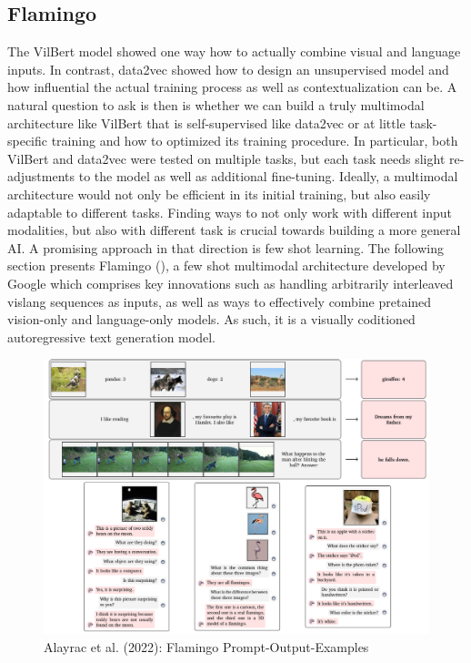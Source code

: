 \documentclass[
]{krantz}
\begin{document}
\hypertarget{flamingo}{%
\subsection{Flamingo}\label{flamingo}}

The VilBert model showed one way how to actually combine visual and language inputs. In contrast, data2vec showed how to design an unsupervised model and how influential the actual training process as well as contextualization can be.
A natural question to ask is then is whether we can build a truly multimodal architecture like VilBert that is self-supervised like data2vec or at little task-specific training and how to optimized its training procedure. In particular, both VilBert and data2vec were tested on multiple tasks, but each task needs slight re-adjustments to the model as well as additional fine-tuning. Ideally, a multimodal architecture would not only be efficient in its initial training, but also easily adaptable to different tasks. Finding ways to not only work with different input modalities, but also with different task is crucial towards building a more general AI. A promising approach in that direction is few shot learning. The following section presents Flamingo (\citet{alayrac2022flamingo}), a few shot multimodal architecture developed by Google which comprises key innovations such as handling arbitrarily interleaved vislang sequences as inputs, as well as ways to effectively combine pretained vision-only and language-only models. As such, it is a visually coditioned autoregressive text generation model.

\begin{figure}

{\centering \includegraphics[width=1\linewidth]{figures/05-chapter2/flamingoexamples} 

}

\caption{Alayrac et al. (2022): Flamingo Prompt-Output-Examples}\label{fig:flamingoexamples}
\end{figure}
\end{document}
